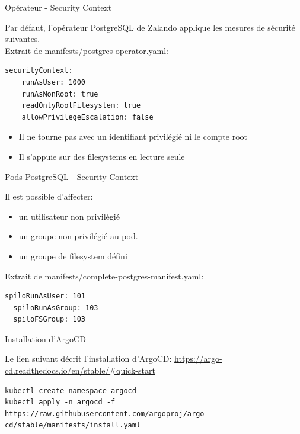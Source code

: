 \begin{frame}[fragile]{Opérateur - Security Context}

   Par défaut, l'opérateur PostgreSQL de Zalando applique les mesures de sécurité suivantes.\\
   Extrait de manifests/postgres-operator.yaml:

\begin{tiny}
\begin{Verbatim}[commandchars=\&\#\#]
securityContext:
    runAsUser: 1000
    runAsNonRoot: true
    readOnlyRootFilesystem: true
    allowPrivilegeEscalation: false
\end{Verbatim}
\end{tiny}

\begin{itemize}
   \item Il ne tourne pas avec un identifiant privilégié ni le compte root
   \item Il s'appuie sur des filesystems en lecture seule
\end{itemize}

\end{frame}


\begin{frame}[fragile]{Pods PostgreSQL - Security Context}

   Il est possible d'affecter:
\begin{itemize}
   \item un utilisateur non privilégié
   \item un groupe non privilégié au pod.
   \item un groupe de filesystem défini
\end{itemize}

   Extrait de manifests/complete-postgres-manifest.yaml:
\begin{tiny}
\begin{Verbatim}[commandchars=\&\@\@]
  spiloRunAsUser: 101
  spiloRunAsGroup: 103
  spiloFSGroup: 103
\end{Verbatim}
\end{tiny}

\end{frame}


\begin{frame}[fragile]{Installation d'ArgoCD}

Le lien suivant décrit l'installation d'ArgoCD: \url{https://argo-cd.readthedocs.io/en/stable/#quick-start}

\begin{tiny}
\begin{Verbatim}[commandchars=\&\#\#]
kubectl create namespace argocd
kubectl apply -n argocd -f https://raw.githubusercontent.com/argoproj/argo-cd/stable/manifests/install.yaml
\end{Verbatim}
\end{tiny}

\end{frame}

